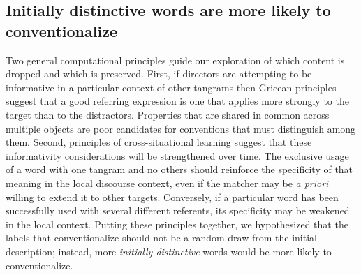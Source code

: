 \documentclass[alpha-refs]{wiley-article}
\begin{document}
\subsection{Initially distinctive words are more likely to conventionalize}
\label{sec:distinctive}

Two general computational principles guide our exploration of which content is dropped and which is preserved.
First, if directors are attempting to be informative in a particular context of other tangrams then Gricean principles suggest that a good referring expression is one that applies more strongly to the target than to the distractors. 
Properties that are shared in common across multiple objects are poor candidates for conventions that must distinguish among them.
Second, principles of cross-situational learning suggest that these informativity considerations will be strengthened over time.
The exclusive usage of a word with one tangram and no others should reinforce the specificity of that meaning in the local discourse context, even if the matcher may be \emph{a priori} willing to extend it to other targets.
Conversely, if a particular word has been successfully used with several different referents, its specificity may be weakened in the local context.
Putting these principles together, we hypothesized that the labels that conventionalize should not be a random draw from the initial description; instead, more \emph{initially distinctive} words would be more likely to conventionalize.
\end{document}
